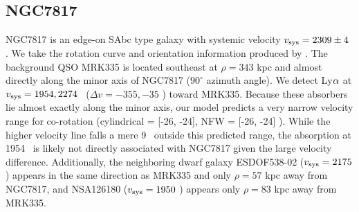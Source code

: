\subsection{NGC7817}
NGC7817 is an edge-on SAbc type galaxy with systemic velocity $v_{\rm sys} = 2309 \pm 4$ \kms. We take the rotation curve and orientation information produced by \cite{rhee1996}. The background QSO MRK335 is located southeast at $\rho = 343$ kpc and almost directly along the minor axis of NGC7817 ($90^{\circ}$ azimuth angle). We detect Ly$\rm \alpha$ at $v_{\rm sys} = 1954, 2274$ \kms~($\Delta v = -355, -35$ \kms) toward MRK335. Because these absorbers lie almost exactly along the minor axis, our model predicts a very narrow velocity range for co-rotation (cylindrical = [-26, -24], NFW = [-26, -24] \kms). While the higher velocity line falls a mere 9 \kms~outside this predicted range, the absorption at 1954 \kms~is likely not directly associated with NGC7817 given the large velocity difference. Additionally, the neighboring dwarf galaxy ESDOF538-02 ($v_{\rm sys} = 2175$  \kms) appears in the same direction as MRK335 and only $\rho = 57$ kpc away from NGC7817, and NSA126180 ($v_{\rm sys} = 1950$ \kms) appears only $\rho = 83$ kpc away from MRK335.








